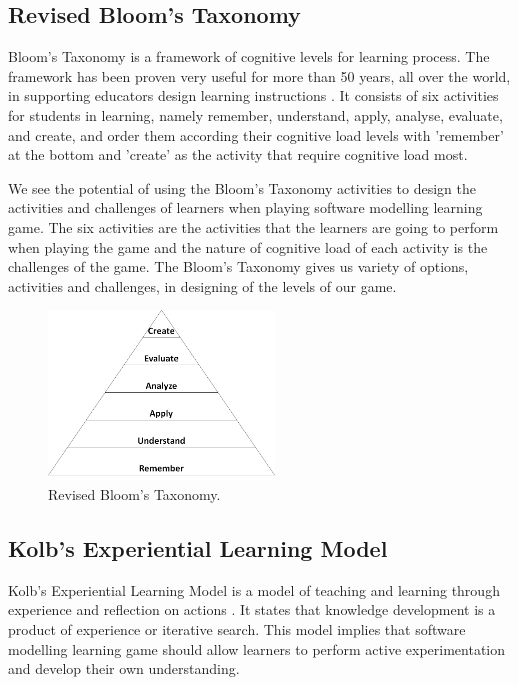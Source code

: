 \documentclass[12pt, a4paper]{report}
\begin{document}
\subsection{Revised Bloom's Taxonomy}
Bloom's Taxonomy \cite{krathwohl2002revision} is a framework of cognitive levels for learning process. The framework has been proven very useful for more than 50 years, all over the world, in supporting educators design learning instructions \cite{munzenmaier2013bloom}. It consists of six activities for students in learning, namely remember, understand, apply, analyse, evaluate, and create, and order them according their cognitive load levels with 'remember' at the bottom and 'create' as the activity that require cognitive load most. 

We see the potential of using the Bloom's Taxonomy activities to design the activities and challenges of learners when playing software modelling learning game. The six activities are the activities that the learners are going to perform when playing the game and the nature of cognitive load of each activity is the challenges of the game. The Bloom's Taxonomy gives us variety of options, activities and challenges, in designing of the levels of our game.

\begin{figure}[ht]
\centering
\includegraphics[width=6cm]{bloom}
\caption{Revised Bloom's Taxonomy\cite{krathwohl2002revision}.}
\label{fig:bloom}
\end{figure}

\subsection{Kolb’s Experiential Learning Model}
Kolb's Experiential Learning Model is a model of teaching and learning through experience and reflection on actions \cite{kolb2014experiential}. It states that knowledge development is a product of experience or iterative search. This model implies that software modelling learning game should allow learners to perform active experimentation and develop their own understanding. 
\end{document}
